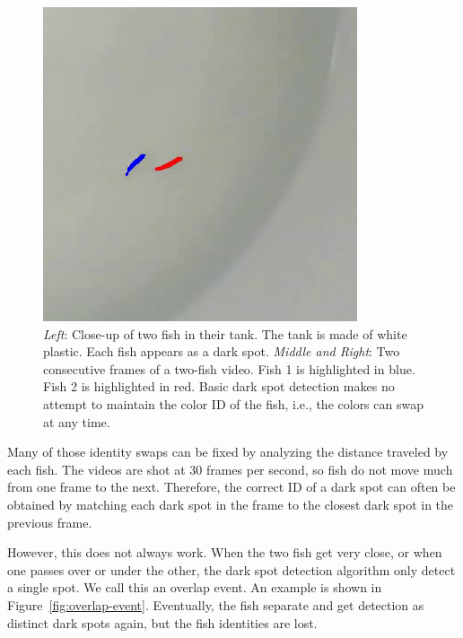 \documentclass{article}
\newlength{\mylen}
\begin{document}
\begin{figure}[H]
	\includegraphics[height=\mylen]{simple-swap2}
	\caption{\emph{Left}: Close-up of two fish in their tank. The tank is made of white plastic. Each fish appears as a dark spot. \emph{Middle and Right}: Two consecutive frames of a two-fish video. Fish 1 is highlighted in blue. Fish 2 is highlighted in red. Basic dark spot detection makes no attempt to maintain the color ID of the fish, i.e., the colors can swap at any time.}
	\label{fig:fish}
\end{figure}

Many of those identity swaps can be fixed by analyzing the distance traveled by each fish. The videos are shot at 30 frames per second, so fish do not move much from one frame to the next. Therefore, the correct ID of a dark spot can often be obtained by matching each dark spot in the frame to the closest dark spot in the previous frame.


However, this does not always work. When the two fish get very close, or when one passes over or under the other, the dark spot detection algorithm only detect a single spot. We call this an overlap event. An example is shown in Figure~\ref{fig:overlap-event}. Eventually, the fish separate and get detection as distinct dark spots again, but the fish identities are lost.
\end{document}
